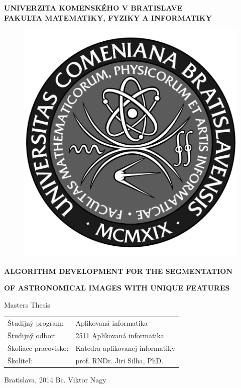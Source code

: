 \documentclass[12pt, a4paper, oneside]{book}
\newcommand\mfthesistype{Masters Thesis}
\newcommand\mfauthor{Bc. Viktor Nagy}
\newcommand\mfadvisor{prof. RNDr. Jiri Silha, PhD.}
\newcommand\mfplacedate{Bratislava, 2014}
\newcommand\mfuniversity{UNIVERZITA KOMENSKÉHO V BRATISLAVE}
\newcommand\mffaculty{FAKULTA MATEMATIKY, FYZIKY A INFORMATIKY}
\begin{document}
\thispagestyle{empty}

\noindent
\begin{minipage}{\textwidth}
\begin{center}
\textbf{\mfuniversity \\
\mffaculty}
\end{center}
\end{minipage}

\vfill
\begin{figure}[!hbt]
\begin{center}
\includegraphics{images/logo_fmph_dark}
\label{img:logo_dark}
\end{center}
\end{figure}
\begin{center}
\begin{minipage}{0.8\textwidth}
		\centerline{\textbf{\Large\MakeUppercase{Algorithm development for the segmentation}}}
		\centerline{\textbf{\Large\MakeUppercase{of astronomical images with unique features}}}
\smallskip
\centerline{\mfthesistype}
\end{minipage}
\end{center}
\vfill
\begin{tabular}{l l}
Študijný program: & Aplikovaná informatika\\
Študijný odbor: & 2511 Aplikovaná informatika\\
Školiace pracovisko: & Katedra aplikovanej informatiky\\
Školiteľ: & \mfadvisor
\end{tabular}
\vfill
\noindent
\mfplacedate \hfill
\mfauthor
\eject 
\end{document}
